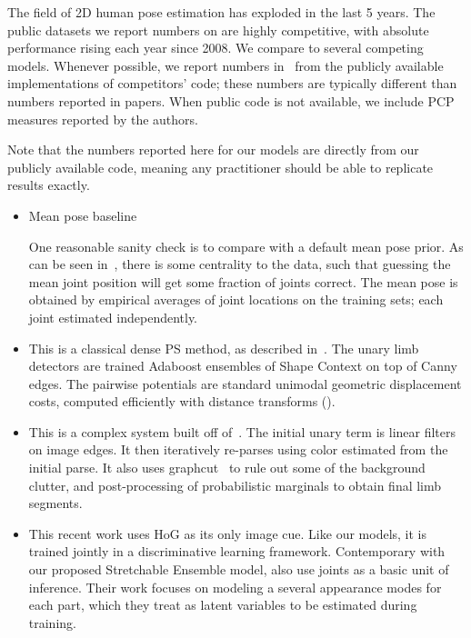 The field of 2D human pose estimation has exploded in the last 5 years.  The 
public datasets we report numbers on are highly competitive, with absolute 
performance rising each year since 2008.  We compare to several competing 
models.  Whenever possible, we report numbers in~ from the 
publicly available implementations of competitors' code; these numbers are 
typically different than numbers reported in papers.  When public code is not 
available, we include PCP measures reported by the authors.

Note that the numbers reported here for our models are directly from our 
publicly available code, meaning any practitioner should be able to replicate 
results exactly.

\begin{itemize}
\item Mean pose baseline 

One reasonable sanity check is to compare with a default mean pose prior.  As 
can be seen in~, there is some centrality to the 
data, such that guessing the mean joint position will get some fraction of joints 
correct.  The mean pose is obtained by empirical averages of joint locations on 
the training sets; each joint estimated independently.

\item \citet{andriluka09} 

This is a classical dense PS method, as described in~.  The unary 
limb detectors are trained Adaboost ensembles of Shape Context on top of Canny 
edges.  The pairwise potentials are standard unimodal geometric displacement 
costs, computed efficiently with distance transforms ().

\item \citet{eichner09} 

This is a complex system built off of~\citet{devacrf}.  The initial unary term 
is linear filters on image edges.  It then iteratively re-parses using color 
estimated from the initial parse.  It also uses graphcut~\citep{boykov2001} to 
rule out some of the background clutter, and post-processing of probabilistic 
marginals to obtain final limb segments.

\item \citet{deva2011} 

This recent work uses HoG as its only image cue.  Like our models, it is 
trained jointly in a discriminative learning framework.  Contemporary with our 
proposed Stretchable Ensemble model, \citet{deva2011} also use joints as a 
basic unit of inference.  Their work focuses on modeling a several appearance 
modes for each part, which they treat as latent variables to be estimated 
during training.  \end{itemize}


